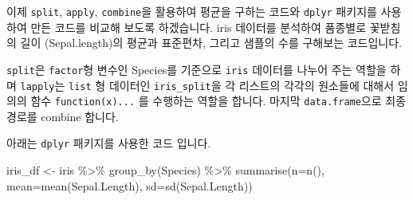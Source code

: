 \documentclass[
]{book}
\newenvironment{Shaded}{\begin{snugshade}}{\end{snugshade}}
\newcommand{\AttributeTok}[1]{\textcolor[rgb]{0.77,0.63,0.00}{#1}}
\newcommand{\ControlFlowTok}[1]{\textcolor[rgb]{0.13,0.29,0.53}{\textbf{#1}}}
\newcommand{\FunctionTok}[1]{\textcolor[rgb]{0.00,0.00,0.00}{#1}}
\newcommand{\NormalTok}[1]{#1}
\newcommand{\OtherTok}[1]{\textcolor[rgb]{0.56,0.35,0.01}{#1}}
\newcommand{\SpecialCharTok}[1]{\textcolor[rgb]{0.00,0.00,0.00}{#1}}
\begin{document}
이제 \texttt{split}, \texttt{apply}, \texttt{combine}을 활용하여 평균을 구하는 코드와 \texttt{dplyr} 패키지를 사용하여 만든 코드를 비교해 보도록 하겠습니다. iris 데이터를 분석하여 품종별로 꽃받침의 길이 (Sepal.length)의 평균과 표준편차, 그리고 샘플의 수를 구해보는 코드입니다.

\texttt{split}은 \texttt{factor}형 변수인 Species를 기준으로 \texttt{iris} 데이터를 나누어 주는 역할을 하며 \texttt{lapply}는 \texttt{list} 형 데이터인 \texttt{iris\_split}을 각 리스트의 각각의 원소들에 대해서 임의의 함수 \texttt{function(x)...} 를 수행하는 역할을 합니다. 마지막 \texttt{data.frame}으로 최종 경로를 combine 합니다.

\begin{Shaded}
\end{Shaded}

아래는 \texttt{dplyr} 패키지를 사용한 코드 입니다.

\begin{Shaded}
\begin{Highlighting}[]
\NormalTok{iris\_df }\OtherTok{\textless{}{-}}\NormalTok{ iris }\SpecialCharTok{\%\textgreater{}\%} 
  \FunctionTok{group\_by}\NormalTok{(Species) }\SpecialCharTok{\%\textgreater{}\%} 
  \FunctionTok{summarise}\NormalTok{(}\AttributeTok{n=}\FunctionTok{n}\NormalTok{(), }\AttributeTok{mean=}\FunctionTok{mean}\NormalTok{(Sepal.Length), }\AttributeTok{sd=}\FunctionTok{sd}\NormalTok{(Sepal.Length))}
\end{Highlighting}
\end{Shaded}
\end{document}
